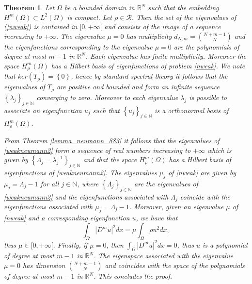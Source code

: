 \documentclass[11pt,a4paper]{amsart}
\numberwithin{equation}{section}
\newtheorem{thm}[equation]{Theorem}
\newcommand{\rea}{\mathbb{R}}
\begin{document}
\begin{thm}\label{teorema_neumann_883}
Let $\Omega$ be a bounded domain in $\rea^N$ such that the embedding $H^m(\Omega)\subset L^2(\Omega)$ is compact. Let $\rho\in\mathcal R$. Then the set of the eigenvalues of (\ref{nweak}) is contained in $[0,+\infty[$ and consists of the image of a sequence increasing to $+\infty$. The eigenvalue $\mu=0$ has multiplicity $d_{N,m}=\binom{N+m-1}{N}$ and the eigenfunctions corresponding to the eigenvalue $\mu=0$ are the polynomials of degree at most $m-1$ in $\mathbb R^N$. Each eigenvalue has finite multiplicity. Moreover the space $H^m_{\rho}(\Omega)$ has a Hilbert basis of eigenfunctions of problem \eqref{nweak}.
\proof
We note that $ker(T_{\rho})=\left\{0\right\}$, hence by standard spectral theory it follows that the eigenvalues of $T_{\rho}$ are positive  and bounded and form an infinite sequence $\left\{\lambda_j\right\}_{j\in\mathbb N}$ converging to zero. Moreover to each eigenvalue $\lambda_j$ is possible to associate an eigenfunction $u_j$ such that $\left\{u_j\right\}_{j\in\mathbb N}$ is a orthonormal basis of $H^m_{\rho}(\Omega)$. 

From Theorem \ref{lemma_neumann_883} it follows that the eigenvalues of \eqref{weakneumann2} form a sequence of real numbers increasing to $+\infty$ which is given by $\left\{\Lambda_j=\lambda_j^{-1}\right\}_{j\in\mathbb N}$ and that the space $H^m_{\rho}(\Omega)$ has a Hilbert basis of eigenfunctions of \eqref{weakneumann2}. The eigenvalues $\mu_j$ of \eqref{nweak} are given by $\mu_j=\Lambda_j-1$ for all $j\in\mathbb N$, where $\left\{\Lambda_j\right\}_{j\in\mathbb N}$ are the eigenvalues of \eqref{weakneumann2} and the eigenfunctions associated with $\Lambda_j$ coincide with the eigenfunctions associated with $\mu_j=\Lambda_j-1$. Moreover, given an eigenvalue $\mu$ of \eqref{nweak} and a corresponding eigenfunction $u$, we have that
$$
\int_{\Omega}|D^m u|^2dx=\mu\int_{\Omega}\rho u^2 dx,
$$
thus $\mu\in[0,+\infty[$. Finally, if $\mu=0$, then $\int_{\Omega}|D^m u|^2dx=0$, thus $u$ is a polynomial of degree at most $m-1$ in $\mathbb R^N$. The eigenspace associated with the eigenvalue $\mu=0$ has dimension $\binom{N+m-1}{N}$ and coincides with the space of the polynomials of degree at most $m-1$ in $\mathbb R^N$. This concludes the proof.
\end{thm}
\end{document}
